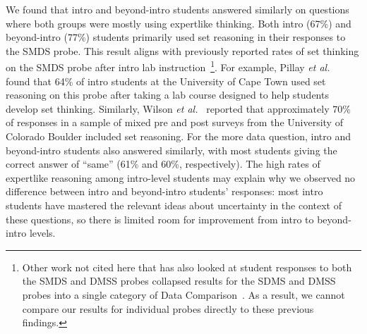 \documentclass[english,aps,prstper,reprint,showpacs,longbibliography,superscriptaddress,nofootinbib]{revtex4-2}
\begin{document}
We found that intro and beyond-intro students answered similarly on questions where both groups were mostly using expertlike thinking. Both intro (67\%) and beyond-intro (77\%) students primarily used set reasoning in their responses to the SMDS probe. This result aligns with previously reported rates of set thinking on the SMDS probe after intro lab instruction~\footnote{Other work not cited here that has also looked at student responses to both the SMDS and DMSS probes collapsed results for the SDMS and DMSS probes into a single category of Data Comparison~\cite{Lubben2001,Buffler2001}. As a result, we cannot compare our results for individual probes directly to these previous findings.}. For example, Pillay \textit{et al.}~\cite{Pillay2008} found that 64\% of intro students at the University of Cape Town used set reasoning on this probe after taking a lab course designed to help students develop set thinking. Similarly, Wilson \textit{et al.}~\cite{Wilson2022} reported that approximately 70\% of responses in a sample of mixed pre and post surveys from the University of Colorado Boulder included set reasoning. For the more data question, intro and beyond-intro students also answered similarly, with most students giving the correct answer of ``same'' (61\% and 60\%, respectively). The high rates of expertlike reasoning among intro-level students may explain why we observed no difference between intro and beyond-intro students' responses: most intro students have mastered the relevant ideas about uncertainty in the context of these questions, so there is limited room for improvement from intro to beyond-intro levels.
 
\end{document}
